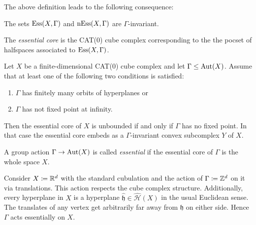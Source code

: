The above definition leads to the following consequence:

\begin{prop}
  The sets \(\operatorname{Ess}(X, \Gamma)\) and \(\operatorname{nEss}(X, \Gamma)\) are \(\Gamma\)-invariant.
\end{prop}

\begin{defin}
  The \emph{essential core} is the CAT(0) cube complex corresponding to the the pocset of halfspaces associated to \(\operatorname{Ess}(X, \Gamma)\).
\end{defin}

\begin{prop}
  \label{prop:cs-3.5}
  Let \(X\) be a finite-dimensional CAT(0) cube complex and let \(\Gamma \leq \operatorname{Aut}(X)\). Assume that at least one of the following two conditions is satisfied:
  \begin{enumerate}
  \item \(\Gamma\) has finitely many orbits of hyperplanes or
  \item \(\Gamma\) has not fixed point at infinity.
  \end{enumerate}
  Then the essential core of \(X\) is unbounded if and only if \(\Gamma\) has no fixed point. In that case the essential core embeds as a \(\Gamma\)-invariant convex subcomplex \(Y\) of \(X\).
\end{prop}


\begin{defin}
  A group action \(\Gamma \to \operatorname{Aut}(X)\) is called \emph{essential} if the essential core of \(\Gamma\) is the whole space \(X\).
\end{defin}

\begin{bsp}
  Consider \(X\coloneqq \mathbb{R}^d\) with the standard cubulation and the action of \(\Gamma \coloneqq \mathbb{Z}^d\) on it via translations. This action respects the cube complex structure. Additionally, every hyperplane in \(X\) is a hyperplane \(\mathfrak{\hat h} \in \mathcal{\hat H}(X)\) in the usual Euclidean sense. The translates of any vertex get arbitrarily far away from \(\mathfrak{h}\) on either side. Hence \(\Gamma\) acts essentially on \(X\).
\end{bsp}

